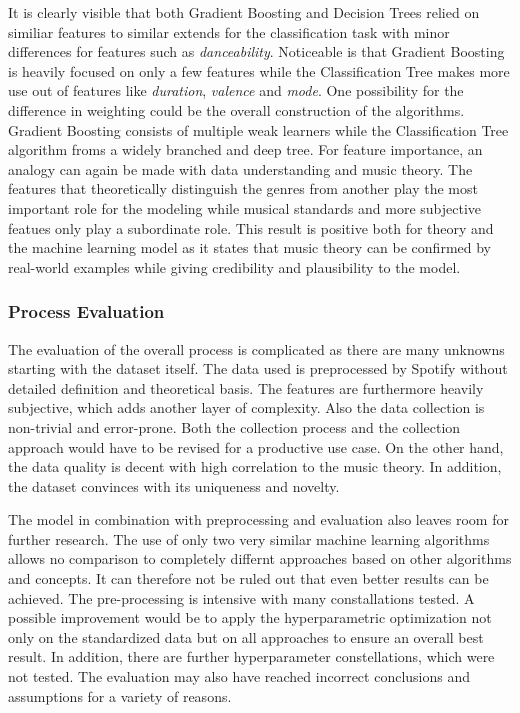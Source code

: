 It is clearly visible that both Gradient Boosting and Decision Trees relied on similiar features to similar extends for the classification task with 
minor differences for features such as \emph{danceability}. Noticeable is that Gradient Boosting is heavily focused on only a few features 
while the Classification Tree makes more use out of features like \emph{duration}, \emph{valence} and \emph{mode}. One possibility for the difference in weighting  
could be the overall construction of the algorithms. Gradient Boosting consists of multiple weak learners while the Classification Tree
algorithm froms a widely branched and deep tree. For feature importance, an analogy can again be made with data understanding and music theory. 
The features that theoretically distinguish the genres from another play the most important role for the modeling while musical standards and 
more subjective featues only play a subordinate role. This result is positive both for theory and the machine learning model as it states 
that music theory can be confirmed by real-world examples while giving credibility and plausibility to the model.

\subsubsection{Process Evaluation}

The evaluation of the overall process is complicated as there are many unknowns starting with the dataset itself. The data used is preprocessed by 
Spotify without detailed definition and theoretical basis. The features are furthermore heavily subjective, which adds another layer of 
complexity. Also the data collection is non-trivial and error-prone. Both the collection process and the collection approach 
would have to be revised for a productive use case. On the other hand, the data quality is decent with high correlation to the music 
theory. In addition, the dataset convinces with its uniqueness and novelty.

The model in combination with preprocessing and evaluation also leaves room for further research. The use of only two very 
similar machine learning algorithms allows no comparison to completely differnt approaches based on other algorithms and concepts. 
It can therefore not be ruled out that even better results can be achieved. The pre-processing is intensive with many constallations 
tested. A possible improvement would be to apply the hyperparametric optimization not only on the standardized data but on all 
approaches to ensure an overall best result. In addition, there are further hyperparameter constellations, which were not tested.
The evaluation may also have reached incorrect conclusions and assumptions for a variety of reasons. 